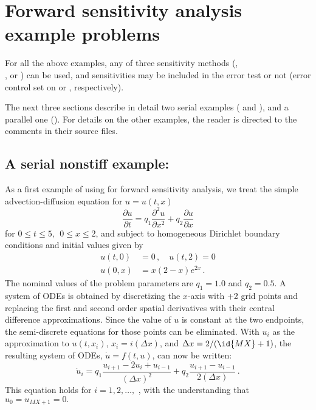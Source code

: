 \section{Forward sensitivity analysis example problems}\label{s:fwd_ex}

For all the above examples, any of three sensitivity methods (, \\
, or ) can be used, and sensitivities may be 
included in the error test or not (error control set on  or ,
respectively).

The next three sections describe in detail two serial examples ( and
), and a parallel one (). For details on the other examples,
the reader is directed to the comments in their source files.

\subsection{A serial nonstiff example: }
\label{ss:cvsfwdnonx}

As a first example of using {\cvodes} for forward sensitivity analysis,
we treat the simple advection-diffusion equation
for $u=u(t,x)$
\begin{equation}\label{e:cvsfwdnonx_PDE}
  \frac{\partial u}{\partial t}= q_1 \frac{\partial ^{2}u}{\partial x^{2}}
  + q_2 \frac{\partial u}{\partial x}
\end{equation}
for $0 \leq t \leq 5, ~~ 0\leq x \leq 2$, and subject to homogeneous
Dirichlet boundary conditions and initial values given by 
\begin{equation}\label{e:cvsfwdnonx_BC_IC}
  \begin{split}
    u(t,0) &= 0 \, , \quad u(t,2) = 0 \\
    u(0,x) &= x(2-x)e^{2x} \, .
  \end{split}
\end{equation}
The nominal values of the problem parameters are $q_1 = 1.0$ and $q_2 = 0.5$.
A system of  ODEs is obtained by discretizing the $x$-axis with +2
grid points and replacing the first and second order spatial derivatives
with their central difference approximations. Since the value of $u$ is
constant at the two endpoints, the semi-discrete equations for those points
can be eliminated.  With $u_{i}$ as the approximation to $u(t,x_{i})$, 
$x_{i} = i(\Delta x)$, and $\Delta x=2/(\id{MX}+1)$, the resulting system of
ODEs, ${\dot u} = f(t,u)$, can now be written:
\begin{equation}\label{e:cvsfwdnonx_ODE}
  {\dot u}_i= q_1 \frac{u_{i+1}-2u_{i}+u_{i-1}}{(\Delta x)^{2}}
  + q_2 \frac{u_{i+1}-u_{i-1}}{2(\Delta x)} \, .
\end{equation}
This equation holds for $i=1,2,\ldots ,$ , with the understanding
that $u_{0} = u_{MX+1}=0.$

